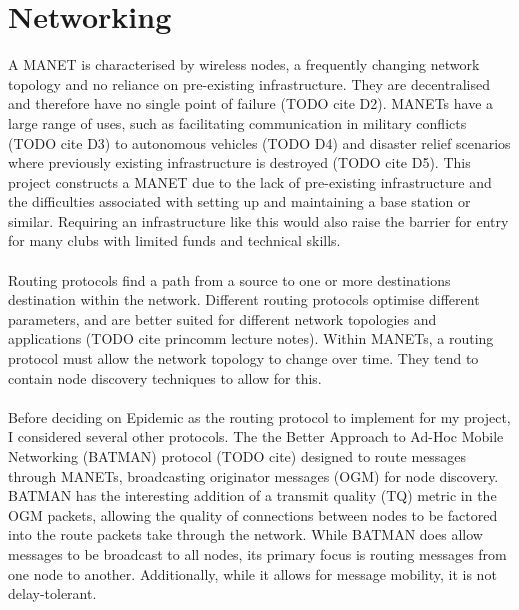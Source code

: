 \documentclass[12pt,a4paper]{report}
\begin{document}
\section{Networking}
A MANET is characterised by wireless nodes, a frequently changing network topology and no reliance on pre-existing infrastructure. They are decentralised and therefore have no single point of failure (TODO cite D2). MANETs have a large range of uses, such as facilitating communication in military conflicts (TODO cite D3) to autonomous vehicles (TODO D4) and disaster relief scenarios where previously existing infrastructure is destroyed (TODO cite D5). This project constructs a MANET due to the lack of pre-existing infrastructure and the difficulties associated with setting up and maintaining a base station or similar. Requiring an infrastructure like this would also raise the barrier for entry for many clubs with limited funds and technical skills. \\ \\
Routing protocols find a path from a source to one or more destinations destination within the network. Different routing protocols optimise different parameters, and are better suited for different network topologies and applications (TODO cite princomm lecture notes). Within MANETs, a routing protocol must allow the network topology to change over time. They tend to contain node discovery techniques to allow for this. \\ \\
Before deciding on Epidemic as the routing protocol to implement for my project, I considered several other protocols. The the Better Approach to Ad-Hoc Mobile Networking (BATMAN) protocol (TODO cite) designed to route messages through MANETs, broadcasting originator messages (OGM) for node discovery. BATMAN has the interesting addition of a transmit quality (TQ) metric in the OGM packets, allowing the quality of connections between nodes to be factored into the route packets take through the network. While BATMAN does allow messages to be broadcast to all nodes, its primary focus is routing messages from one node to another. Additionally, while it allows for message mobility, it is not delay-tolerant.\\ \\
\end{document}
